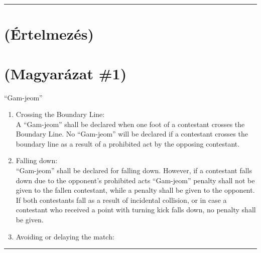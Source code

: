 \documentclass[]{report}
\renewcommand{\labelenumi}{\arabic{enumi}}
\newenvironment{expl}[0]%
  {\rule{\textwidth}{.2pt}\footnotesize}%
  {\rule{\textwidth}{.2pt}\normalsize}
\begin{document}
\begin{expl}

\section*{(Értelmezés)}



\section*{(Magyarázat \#1)}
%

``Gam-jeom''

\begin{enumerate}
\def\labelenumi{\roman{enumi}.}
\item
  Crossing the Boundary Line:\\
   A ``Gam-jeom'' shall be declared when one
  foot of a contestant crosses the Boundary Line. No ``Gam-jeom'' will
  be declared if a contestant crosses the boundary line as a result of a
  prohibited act by the opposing contestant.
\item
  Falling down:\\
 ``Gam-jeom'' shall be declared for falling down.
  However, if a contestant falls down due to the opponent's prohibited
  acts ``Gam-jeom'' penalty shall not be given to the fallen contestant,
  while a penalty shall be given to the opponent. If both contestants
  fall as a result of incidental collision, or in case a contestant who
  received a point with turning kick falls down, no penalty shall be
  given.
\item
  Avoiding or delaying the match:


\end{enumerate}
\end{expl}
\end{document}
